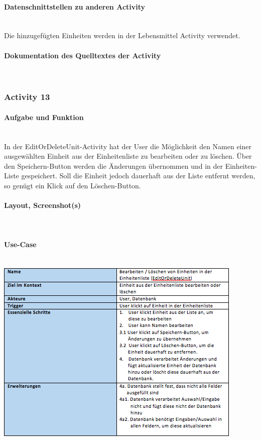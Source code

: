 \paragraph{Datenschnittstellen zu anderen Activity}\\
Die hinzugefügten Einheiten werden in der Lebensmittel Activity verwendet. 

\paragraph{Dokumentation des Quelltextes der Activity}\\

\subsubsection{Activity 13}

\paragraph{Aufgabe und Funktion}\\
In der EditOrDeleteUnit-Activity hat der User die Möglichkeit den Namen einer ausgewählten Einheit aus der Einheitenliste zu bearbeiten oder zu löschen. Über den Speichern-Button werden die Änderungen übernommen und in der Einheiten-Liste gespeichert. Soll die Einheit jedoch dauerhaft aus der Liste entfernt werden, so genügt ein Klick auf den Löschen-Button.

\paragraph{Layout, Screenshot(s)}\\
\paragraph{Use-Case}$~~$\\
\newline
\includegraphics[scale=1]{img/usecaseeodunit}\\
